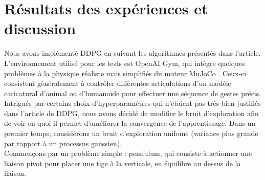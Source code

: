 \documentclass[letterpaper, french]{article}
\begin{document}
\section{Résultats des expériences et discussion}
Nous avons implémenté DDPG en suivant les algorithmes présentés dans l'article. L'environnement utilisé pour les tests est OpenAI Gym, qui intègre quelques problèmes à la physique réaliste mais simplifiés du moteur MuJoCo \cite{MuJoCo}. Ceux-ci consistent généralement à contrôler différentes articulations d'un modèle caricatural d'animal ou d'humanoïde pour effectuer une séquence de gestes précis.
\smallbreak
Intrigués par certains choix d'hyperparamètres qui n'étaient pas très bien justifiés dans l'article de DDPG, nous avons décidé de modifier le bruit d'exploration afin de voir en quoi il permet d'améliorer la convergence de l'apprentissage. Dans un premier temps, considérons un bruit d'exploration unifome (variance plus grande par rapport à un processus gaussien).\\
Commençons par un problème simple : pendulum, qui consiste à actionner une liaison pivot pour placer une tige à la verticale, en équilibre au dessus de la liaison.
\end{document}
